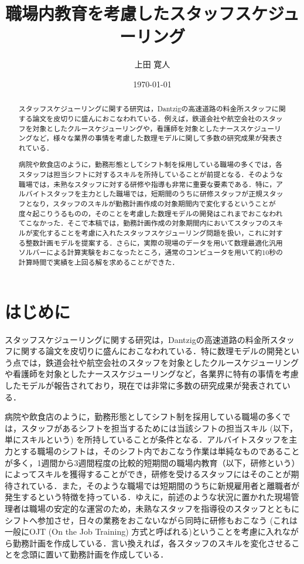 \documentclass[twocolumn]{jsarticle}
\title{職場内教育を考慮したスタッフスケジューリング}
\author{上田 寛人}
\date{\today}
\begin{document}
\begin{abstract}
スタッフスケジューリングに関する研究は，Dantzigの高速道路の料金所スタッフに関する論文を皮切りに盛んにおこなわれている．例えば，鉄道会社や航空会社のスタッフを対象としたクルースケジューリングや，看護師を対象としたナーススケジューリングなど，様々な業界の事情を考慮した数理モデルに関して多数の研究成果が発表されている．

病院や飲食店のように，勤務形態としてシフト制を採用している職場の多くでは，各スタッフは担当シフトに対するスキルを所持していることが前提となる．そのような職場では，未熟なスタッフに対する研修や指導も非常に重要な要素である．特に，アルバイトスタッフを主力とした職場では，短期間のうちに研修スタッフが正規スタッフとなり，スタッフのスキルが勤務計画作成の対象期間内で変化するということが度々起こりうるものの，そのことを考慮した数理モデルの開発はこれまでおこなわれてこなかった．そこで本稿では，勤務計画作成の対象期間内においてスタッフのスキルが変化することを考慮に入れたスタッフスケジューリング問題を扱い，これに対する整数計画モデルを提案する．さらに，実際の現場のデータを用いて数理最適化汎用ソルバーによる計算実験をおこなったところ，通常のコンピュータを用いて約10秒の計算時間で実績を上回る解を求めることができた．
\end{abstract}

\maketitle

\section{はじめに}
スタッフスケジューリングに関する研究は，Dantzigの高速道路の料金所スタッフに関する論文\cite{bib:dantzig}を皮切りに盛んにおこなわれている．特に数理モデルの開発という点では，鉄道会社や航空会社のスタッフを対象としたクルースケジューリング\cite{bib:air}や看護師を対象としたナーススケジューリング\cite{bib:nurse_1, bib:nurse_2}など，各業界に特有の事情を考慮したモデルが報告されており，現在では非常に多数の研究成果が発表されている\cite{bib:survey_1, bib:survey_2}．

病院や飲食店のように，勤務形態としてシフト制を採用している職場の多くでは，スタッフがあるシフトを担当するためには当該シフトの担当スキル (以下，単にスキルという) を所持していることが条件となる．アルバイトスタッフを主力とする職場のシフトは，そのシフト内でおこなう作業は単純なものであることが多く，1週間から3週間程度の比較的短期間の職場内教育（以下，研修という）によってスキルを獲得することができ，研修を受けるスタッフにはそのことが期待されている．また，そのような職場では短期間のうちに新規雇用者と離職者が発生するという特徴を持っている．ゆえに，前述のような状況に置かれた現場管理者は職場の安定的な運営のため，未熟なスタッフを指導役のスタッフとともにシフトへ参加させ，日々の業務をおこないながら同時に研修もおこなう (これは一般にOJT (On the Job Training) 方式と呼ばれる\cite[pp.27-28]{bib:ojt})ということを考慮に入れながら勤務計画を作成している．言い換えれば，各スタッフのスキルを変化させることを念頭に置いて勤務計画を作成している．
\end{document}
